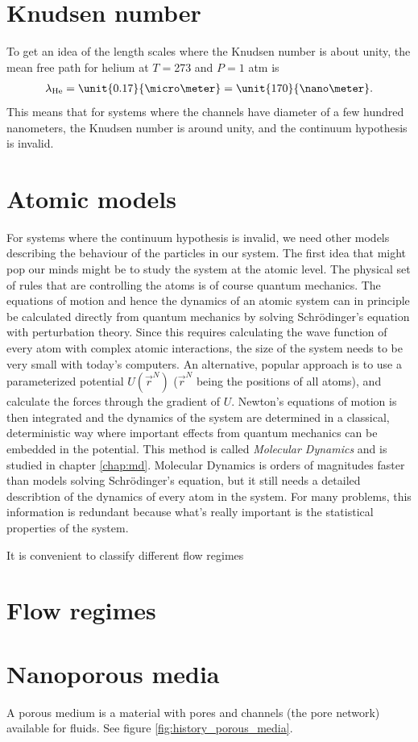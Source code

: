 \section{Knudsen number}
\label{sec:knudsen_number}
To get an idea of the length scales where the Knudsen number is about unity, the mean free path for helium at $T=$\unit{273}{\kelvin} and $P=1$ atm is\cite{lillestol2001generell} 
\begin{align}
	\label{eq:helium_mfp}
	\lambda_{\text{He}} = \unit{0.17}{\micro\meter} = \unit{170}{\nano\meter}.
\end{align}
This means that for systems where the channels have diameter of a few hundred nanometers, the Knudsen number is around unity, and the continuum hypothesis is invalid. 

\section{Atomic models}
\label{sec:theory_of_fluids_atomic_models}
For systems where the continuum hypothesis is invalid, we need other models describing the behaviour of the particles in our system. The first idea that might pop our minds might be to study the system at the atomic level. The physical set of rules that are controlling the atoms is of course quantum mechanics. The equations of motion and hence the dynamics of an atomic system can in principle be calculated directly from quantum mechanics by solving Schr\"{o}dinger's equation with perturbation theory. Since this requires calculating the wave function of every atom with complex atomic interactions, the size of the system needs to be very small with today's computers. An alternative, popular approach is to use a parameterized potential $U(\vec r^N)$ ($\vec r^N$ being the positions of all atoms), and calculate the forces through the gradient of $U$. Newton's equations of motion is then integrated and the dynamics of the system are determined in a classical, deterministic way where important effects from quantum mechanics can be embedded in the potential. This method is called \textit{Molecular Dynamics} and is studied in chapter \ref{chap:md}. Molecular Dynamics is orders of magnitudes faster than models solving Schr\"{o}dinger's equation, but it still needs a detailed describtion of the dynamics of every atom in the system. For many problems, this information is redundant because what's really important is the statistical properties of the system.

 It is convenient to classify different flow regimes 
\section{Flow regimes}
\section{Nanoporous media}
\label{sec:nanoporous_media}
A porous medium is a material with pores and channels (the pore network) available for fluids. See figure \ref{fig:history_porous_media}. 
